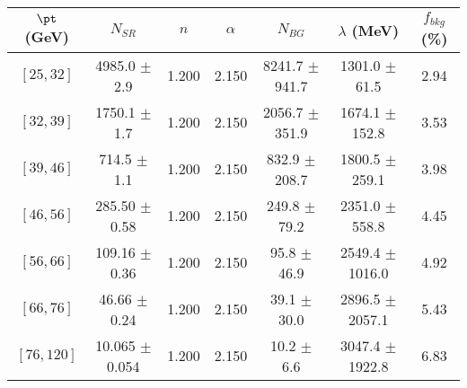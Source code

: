 \begin{tabular}{c||c|c|c|c|c||c}
$\pt$ (GeV) & $N_{SR}$ & $n$ & $\alpha$ & $N_{BG}$  & $\lambda$ (MeV) & $f_{bkg}$ (\%) \\
\hline
$[25, 32]$ & 4985.0 $\pm$ 2.9 & 1.200 & 2.150 & 8241.7 $\pm$ 941.7 & 1301.0 $\pm$ 61.5 & 2.94\\
$[32, 39]$ & 1750.1 $\pm$ 1.7 & 1.200 & 2.150 & 2056.7 $\pm$ 351.9 & 1674.1 $\pm$ 152.8 & 3.53\\
$[39, 46]$ & 714.5 $\pm$ 1.1 & 1.200 & 2.150 & 832.9 $\pm$ 208.7 & 1800.5 $\pm$ 259.1 & 3.98\\
$[46, 56]$ & 285.50 $\pm$ 0.58 & 1.200 & 2.150 & 249.8 $\pm$ 79.2 & 2351.0 $\pm$ 558.8 & 4.45\\
$[56, 66]$ & 109.16 $\pm$ 0.36 & 1.200 & 2.150 & 95.8 $\pm$ 46.9 & 2549.4 $\pm$ 1016.0 & 4.92\\
$[66, 76]$ & 46.66 $\pm$ 0.24 & 1.200 & 2.150 & 39.1 $\pm$ 30.0 & 2896.5 $\pm$ 2057.1 & 5.43\\
$[76, 120]$ & 10.065 $\pm$ 0.054 & 1.200 & 2.150 & 10.2 $\pm$ 6.6 & 3047.4 $\pm$ 1922.8 & 6.83\\
\end{tabular}
